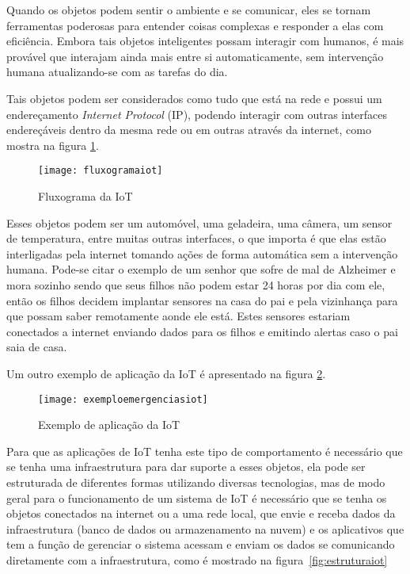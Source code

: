 \begin{citacao}
Quando os objetos podem sentir o ambiente e se comunicar, eles se tornam ferramentas poderosas para entender coisas complexas e responder a elas com eficiência. Embora tais objetos inteligentes possam interagir com humanos, é mais provável que interajam ainda mais entre si automaticamente, sem intervenção humana atualizando-se com as tarefas do dia.\cite[p. 2]{presser2011}
\end{citacao}

Tais objetos podem ser considerados como tudo que está na rede e possui um endereçamento \textit{Internet Protocol} (IP), podendo interagir com outras interfaces endereçáveis dentro da mesma rede ou em outras através da internet, como mostra na figura \ref{fig:fluxogramaiot}.~\cite{ihs2013}

\begin{figure}[htb]
\caption{\label{fig:fluxogramaiot} Fluxograma da IoT}
\begin{center}
\texttt{[image: fluxogramaiot]}
\end{center}
\end{figure}

Esses objetos podem ser um automóvel, uma geladeira, uma câmera, um sensor de temperatura, entre muitas outras interfaces, o que importa é que elas estão interligadas pela internet tomando ações de forma automática sem a intervenção humana. Pode-se citar o exemplo de um senhor que sofre de mal de Alzheimer e mora sozinho sendo que seus filhos não podem estar 24 horas por dia com ele, então os filhos decidem implantar sensores na casa do pai e pela vizinhança para que possam saber remotamente aonde ele está. Estes sensores estariam conectados a internet enviando dados para os filhos e emitindo alertas caso o pai saia de casa.\cite{presser2011}

Um outro exemplo de aplicação da IoT é apresentado na figura \ref{fig:exemploemergenciasiot}.

\begin{figure}[htb]
\caption{\label{fig:exemploemergenciasiot} Exemplo de aplicação da IoT}
\begin{center}
\texttt{[image: exemploemergenciasiot]}
\end{center}
\end{figure}

Para que as aplicações de IoT tenha este tipo de comportamento é necessário que se tenha uma infraestrutura para dar suporte a esses objetos, ela pode ser estruturada de diferentes formas utilizando diversas tecnologias, mas de modo geral para o funcionamento de um sistema de IoT é necessário que se tenha os objetos conectados na internet ou a uma rede local, que envie e receba dados da infraestrutura (banco de dados ou armazenamento na nuvem) e os aplicativos que tem a função de gerenciar o sistema acessam e enviam os dados se comunicando diretamente com a infraestrutura, como é mostrado na figura~\ref{fig:estruturaiot}~\cite{ihs2013}

